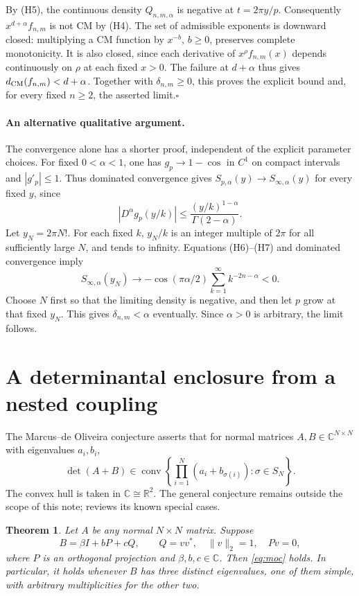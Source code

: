 \documentclass[11pt,a4paper]{article}
\newtheorem{theorem}{Theorem}[section]
\theoremstyle{remark}
\begin{document}
By (H5), the continuous density $Q_{n,m,\alpha}$ is negative at
$t=2\pi y/p$. Consequently $x^{d+\alpha}f_{n,m}$ is not CM by (H4).
The set of admissible exponents is downward closed: multiplying a CM
function by $x^{-b}$, $b\geq0$, preserves complete monotonicity.
It is also closed, since each derivative of $x^\rho f_{n,m}(x)$ depends
continuously on $\rho$ at each fixed $x>0$.
The failure at $d+\alpha$ thus gives
$d_{\rm CM}(f_{n,m})<d+\alpha$.
Together with $\delta_{n,m}\geq0$, this proves the explicit bound and,
for every fixed $n\geq2$, the asserted limit.\hfill$\square$

\paragraph{An alternative qualitative argument.}
The convergence alone has a shorter proof, independent of the explicit
parameter choices. For fixed $0<\alpha<1$, one has
$g_p\to1-\cos$ in $C^1$ on compact intervals and $|g'_p|\leq1$.
Thus dominated convergence gives
$S_{p,\alpha}(y)\to S_{\infty,\alpha}(y)$ for every fixed $y$, since
\[
 |D^\alpha g_p(y/k)|\leq
 \frac{(y/k)^{1-\alpha}}{\Gamma(2-\alpha)}.
\]
Let $y_N=2\pi N!$. For each fixed $k$, $y_N/k$ is an integer multiple
of $2\pi$ for all sufficiently large $N$, and tends to infinity.
Equations (H6)--(H7) and dominated convergence imply
\[
 S_{\infty,\alpha}(y_N)
 \longrightarrow
 -\cos(\pi\alpha/2)\sum_{k=1}^\infty k^{-2n-\alpha}<0.
\]
Choose $N$ first so that the limiting density is negative, and then
let $p$ grow at that fixed $y_N$. This gives $\delta_{n,m}<\alpha$
eventually. Since $\alpha>0$ is arbitrary, the limit follows.

\section{A determinantal enclosure from a nested coupling}

The Marcus--de Oliveira conjecture asserts that for normal matrices
$A,B\in\mathbb C^{N\times N}$ with eigenvalues $a_i,b_i$,
\begin{equation}\label{eq:moc}
 \det(A+B)\in\operatorname{conv}
 \left\{\prod_{i=1}^N(a_i+b_{\sigma(i)}):\sigma\in S_N\right\}.
\end{equation}
The convex hull is taken in $\mathbb C\cong\mathbb R^2$.
The general conjecture remains outside the scope of this note;
\cite{survey} reviews its known special cases.

\begin{theorem}\label{thm:moc}
Let $A$ be any normal $N\times N$ matrix. Suppose
\[
 B=\beta I+bP+cQ,\qquad Q=vv^*,\quad \|v\|_2=1,\quad Pv=0,
\]
where $P$ is an orthogonal projection and $\beta,b,c\in\mathbb C$.
Then \eqref{eq:moc} holds. In particular, it holds whenever $B$
has three distinct eigenvalues, one of them simple, with arbitrary
multiplicities for the other two.
\end{theorem}
\end{document}

